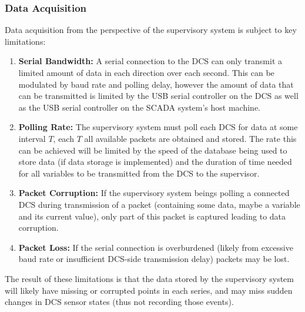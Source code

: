 \documentclass[../main.tex]{subfiles}
\begin{document}
\subsubsection{Data Acquisition}
\label{sec:data_aq}
Data acquisition from the perspective of the supervisory system is subject to key limitations:
\begin{enumerate}[label=\arabic*.]

\item \textbf{Serial Bandwidth:} A serial connection to the DCS can only transmit a limited amount of data in each direction over each second. This can be modulated by baud rate and polling delay, however the amount of data that can be transmitted is limited by the USB serial controller on the DCS as well as the USB serial controller on the SCADA system's host machine.

\item \textbf{Polling Rate:} The supervisory system must poll each DCS for data at some interval $T$, each $T$ all available packets are obtained and stored. The rate this can be achieved will be limited by the speed of the database being used to store data (if data storage is implemented) and the duration of time needed for all variables to be transmitted from the DCS to the supervisor.

\item \textbf{Packet Corruption:} If the supervisory system beings polling a connected DCS during transmission of a packet (containing some data, maybe a variable and its current value), only part of this packet is captured leading to data corruption.

\item \textbf{Packet Loss:} If the serial connection is overburdened (likely from excessive baud rate or insufficient DCS-side transmission delay) packets may be lost.

\end{enumerate}
The result of these limitations is that the data stored by the supervisory system will likely have missing or corrupted points in each series, and may miss sudden changes in DCS sensor states (thus not recording those events).
\end{document}
